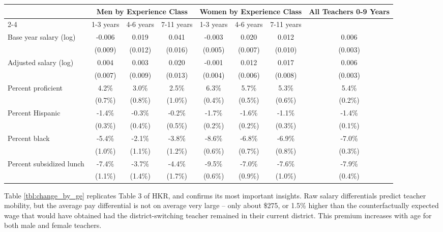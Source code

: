 \documentclass[12pt,]{article}
\begin{document}
\begin{sidewaystable}[htbp]
\centering
\begin{tabular}{lccccccc}
  \hline
 & \multicolumn{3}{c}{Men by Experience Class} & \multicolumn{3}{c}{Women by Experience Class} & \multirow{2}{*}{\parbox{0.1\linewidth}{All Teachers 0-9 Years}}\\ \cline{2-4} \cline{5-7}
 & 1-3 years & 4-6 years & 7-11 years & 1-3 years & 4-6 years & 7-11 years &  \\ 
  \hline
Base year salary (log) & -0.006 & 0.019 & 0.041 & -0.003 & 0.020 & 0.012 & 0.006 \\ 
   & (0.009) & (0.012) & (0.016) & (0.005) & (0.007) & (0.010) & (0.003) \\ 
  Adjusted salary (log) & 0.004 & 0.003 & 0.020 & -0.001 & 0.012 & 0.017 & 0.006 \\ 
   & (0.007) & (0.009) & (0.013) & (0.004) & (0.006) & (0.008) & (0.003) \\ 
  Percent proficient & 4.2\% & 3.0\% & 2.5\% & 6.3\% & 5.7\% & 5.3\% & 5.4\% \\ 
   & (0.7\%) & (0.8\%) & (1.0\%) & (0.4\%) & (0.5\%) & (0.6\%) & (0.2\%) \\ 
  Percent Hispanic & -1.4\% & -0.3\% & -0.2\% & -1.7\% & -1.6\% & -1.1\% & -1.4\% \\ 
   & (0.3\%) & (0.4\%) & (0.5\%) & (0.2\%) & (0.2\%) & (0.3\%) & (0.1\%) \\ 
  Percent black & -5.4\% & -2.1\% & -3.8\% & -8.6\% & -6.8\% & -6.9\% & -7.0\% \\ 
   & (1.0\%) & (1.1\%) & (1.2\%) & (0.6\%) & (0.7\%) & (0.8\%) & (0.3\%) \\ 
  Percent subsidized lunch & -7.4\% & -3.7\% & -4.4\% & -9.5\% & -7.0\% & -7.6\% & -7.9\% \\ 
   & (1.1\%) & (1.4\%) & (1.7\%) & (0.6\%) & (0.9\%) & (1.0\%) & (0.4\%) \\ 
   \hline
\end{tabular}
\caption{Average Change in Salary and District Student Characteristics (and Standard Deviations) for Teachers Changing Districts, by Gender and Experience} 
\label{tbl:change_by_ge}
\end{sidewaystable}

Table \ref{tbl:change_by_ge} replicates Table 3 of HKR, and confirms its
most important insights. Raw salary differentials predict teacher
mobility, but the average pay differential is not on average very large
-- only about \$275, or 1.5\% higher than the counterfactually expected
wage that would have obtained had the district-switching teacher
remained in their current district. This premium increases with age for
both male and female teachers.
\end{document}

